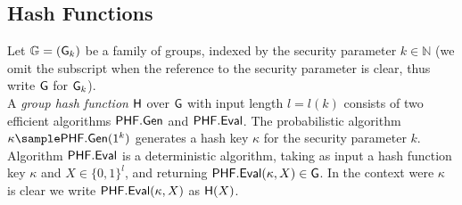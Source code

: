 \begin{figure}[htb!]
    \centering
    
    \nicoresetlinenr
    \caption{}
    \label{fig:rma}
\end{figure}



\subsection{Hash Functions}
Let $\mathbb{G}= (\mathsf{G}_k)$ be a family of groups, indexed by the security parameter $k \in \mathbb{N}$ (we omit the subscript when the reference to the security parameter is clear, thus write $\mathsf{G}$ for $\mathsf{G}_k$).
\\
A \textit{group hash function} $\mathsf{H}$  over $\mathsf{G}$ with input length $l =l(k)$ consists of two efficient algorithms $\mathsf{PHF}.\mathsf{Gen}$ and $\mathsf{PHF}.\mathsf{Eval}$. The probabilistic algorithm 
$\kappa \sample \phfGen(1^k)$ generates a hash key $\kappa$ for the security parameter $k$. Algorithm 
$\mathsf{PHF}.\mathsf{Eval}$ is a deterministic algorithm, taking as input a hash function key $\kappa$ and $X \in \{0,1\}^l$, and returning $\mathsf{PHF}.\mathsf{Eval}(\kappa,X) \in \mathsf{G}$. In the context were $\kappa$ is clear we write 
$\mathsf{PHF}.\mathsf{Eval}(\kappa,X)$ as $\mathsf{H}(X)$.
\\

